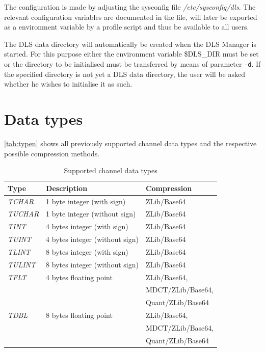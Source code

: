 \documentclass[a4paper,12pt,BCOR6mm,bibtotoc,idxtotoc]{scrbook}
\begin{document}
The configuration is made by adjusting the sysconfig file \textit{/etc/sysconfig/dls}. The relevant configuration variables are documented in the file, will later be exported as a environment variable by a profile script and thus be available to all users.

The DLS data directory will automatically be created when the DLS Manager is started. For this purpose either the environment variable \$DLS\_DIR must be set or the directory to be initialised must be transferred by means of parameter \texttt{-d}. If the specified directory is not yet a DLS data directory, the user will be asked whether he wishes to initialise it as such.


\chapter{Data types} \label{sec:apx_types}

\autoref{tab:typen} shows all previously supported channel data
types and the respective possible compression methods.

\begin{table}[htb]
  \centering \caption{Supported channel data types}
  \label{tab:typen} \vspace{1.5ex}
  \begin{tabular}[thb]{|l|l|l|} \hline
    \textbf{Type} & \textbf{Description} & \textbf{Compression}\\ \hline
    \textit{TCHAR} & 1 byte integer (with sign) & ZLib/Base64\\ \hline
    \textit{TUCHAR} & 1 byte integer (without sign) & ZLib/Base64\\ \hline
    \textit{TINT} & 4 bytes integer (with sign) & ZLib/Base64\\ \hline
    \textit{TUINT} & 4 bytes integer (without sign) & ZLib/Base64\\ \hline
    \textit{TLINT} & 8 bytes integer (with sign) & ZLib/Base64\\ \hline
    \textit{TULINT} & 8 bytes integer (without sign) & ZLib/Base64\\ \hline
    \textit{TFLT} & 4 bytes floating point & ZLib/Base64,\\
                  &                        & MDCT/ZLib/Base64,\\
                  &                        & Quant/ZLib/Base64\\ \hline
    \textit{TDBL} & 8 bytes floating point & ZLib/Base64,\\
                  &                        & MDCT/ZLib/Base64,\\
                  &                        & Quant/ZLib/Base64\\ \hline
  \end{tabular}
\end{table}
\end{document}
